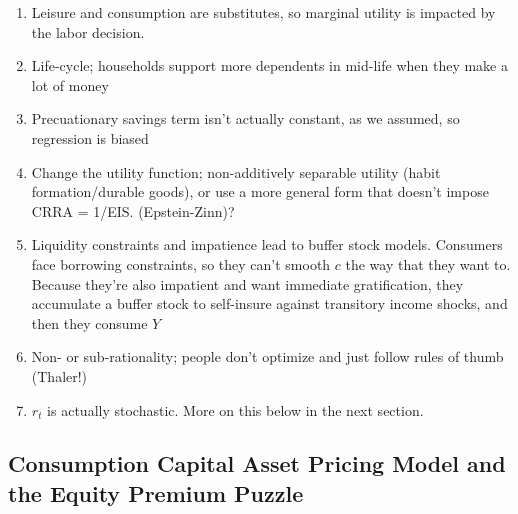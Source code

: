 \documentclass[12pt]{article}
\begin{document}
\begin{itemize}
    \begin{enumerate}
        \item Leisure and consumption are substitutes, so marginal utility is impacted by the labor decision.
        \item Life-cycle; households support more dependents in mid-life when they make a lot of money
        \item Precuationary savings term isn't actually constant, as we assumed, so regression is biased
        \item Change the utility function; non-additively separable utility (habit formation/durable goods), or use a more general form that doesn't impose CRRA = 1/EIS. (Epstein-Zinn)?
        \item Liquidity constraints and impatience lead to buffer stock models. Consumers face borrowing constraints, so they can't smooth $c$ the way that they want to. Because they're also impatient and want immediate gratification, they accumulate a buffer stock to self-insure against transitory income shocks, and then they consume $Y$
        \item Non- or sub-rationality; people don't optimize and just follow rules of thumb (Thaler!)
        \item $r_t$ is actually stochastic. More on this below in the next section.
    \end{enumerate}
\end{itemize}

\subsection{Consumption Capital Asset Pricing Model and the Equity Premium Puzzle}
\end{document}
